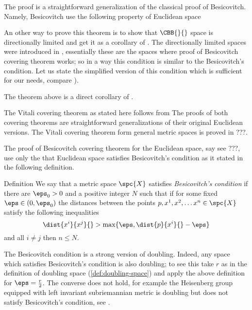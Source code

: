 The proof is a straightforward generalization 
of the classical proof of Besicovitch.
Namely, Besicovitch use the following property of Euclidean space

An other way to prove this theorem is to show that $\CBB{}{}$ space is directionally limited
and get it as a corollary of \cite[Theorem 2.8.14]{federer}.
The directionally limited spaces were introduced in \cite[2.8.9]{federer},
essentially these are the spaces where proof of Besicovitch covering theorem
works;
so in a way this condition is similar to the Besicovitch's condition.
Let us state the simplified version of this condition which is sufficient for our needs, compare \cite[page 7]{heinonen}).







The theorem above is a direct corollary
of \cite[Theorem 2.8.14]{federer}.


The Vitali covering theorem as stated here 
follows from
The proofs of both covering theorems are straightforward generalizations of their original Euclidean versions.
The Vitali covering theorem form general metric spaces is proved in ???.

The proof of Besicovitch covering theorem for the Euclidean space,
say see ???,
use only the that Euclidean space satisfies Besicovitch's condition
as it stated in the following definition.

\begin{thm}{Definition}
We say that a metric space $\spc{X}$ 
satisfies \emph{Besicovitch's condition} if there are $\eps_0>0$
and a positive integer $N$
such that if for some fixed $\eps\in(0,\eps_0)$ 
the distances between the points $p,x^1,x^2,\dots x^n\in\spc{X}$
satisfy the following inequalities
\[\dist{x^i}{x^j}{}>\max\{\eps,\dist{p}{x^i}{}-\eps\}\] 
and all $i\ne j$ 
then
$n\le N$.
\end{thm}

The Besicovitch condition is a strong version of doubling.
Indeed, any space which satisfies Besicovitch's condition
is also doubling;
to see this take $r$ as in 
the definition of doubling space (\ref{def:doubling-space}) and apply the above definition for $\eps=\tfrac r2$. 
The converse does not hold,
for example the Heisenberg group 
equipped with left invariant subriemannian metric
is doubling but does not satisfy Besicovitch's condition,
see \cite[Lemma 4.4]{SW}%
.

